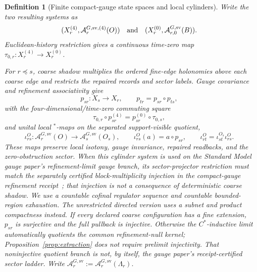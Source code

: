 \documentclass[11pt]{article}
\numberwithin{equation}{section}
\newtheorem{definition}[theorem]{Definition}
\theoremstyle{remark}
\begin{document}
\begin{definition}[Finite compact-gauge state spaces and local cylinders]
Write the two resulting systems as
\[
(X_r^{(4)},\mathcal A_r^{G,\mathrm{sv},(4)}(O))
\quad\hbox{and}\quad
(X_r^{(0)},\mathcal A_{r,0}^{G,\mathrm{sv}}(B)).
\]
Euclidean-history restriction gives a continuous time-zero map
\(\tau_{0,r}:X_r^{(4)}\to X_r^{(0)}\).

For \(r\preceq s\), coarse shadow multiplies the ordered fine-edge holonomies above each coarse
edge and restricts the repaired records and sector labels. Gauge covariance and refinement
associativity give
\[
p_{sr}:X_s\to X_r,
\qquad
p_{tr}=p_{sr}\circ p_{ts},
\]
with the four-dimensional/time-zero commuting square
\[
\tau_{0,r}\circ p_{sr}^{(4)}
=p_{sr}^{(0)}\circ\tau_{0,s},
\]
and unital local \(^*\)-maps on the separated support-visible quotient,
\[
\iota_{rs}^{O}:\mathcal A_r^{G,\mathrm{sv}}(O)\to
\mathcal A_s^{G,\mathrm{sv}}(O_s),
\qquad
\iota_{rs}^{O}(a)=a\circ p_{sr},
\qquad
\iota_{rt}^{O}=\iota_{st}^{O_s}\iota_{rs}^{O}.
\]
These maps preserve local isotony, gauge invariance, repaired readbacks, and the
zero-obstruction sector. When this cylinder system is used on the Standard Model gauge paper's refinement-limit
gauge branch, its sector-projector restriction must match the separately certified
block-multiplicity injection in the compact-gauge refinement receipt~\cite{oph2}; that injection is
not a consequence of deterministic coarse shadow. We use a countable cofinal regulator
sequence and countable bounded-region exhaustion. The unrestricted directed version uses a subnet
and product compactness instead. If every declared coarse configuration has a fine extension,
\(p_{sr}\) is surjective and the full pullback is injective. Otherwise the \(C^*\)-inductive limit
automatically quotients the common refinement-null kernel; Proposition~\ref{prop:extraction} does
not require prelimit injectivity. That noninjective quotient branch is not, by itself, the gauge
paper's receipt-certified sector ladder. Write
\(\mathcal A_r^{G,\mathrm{sv}}:=\mathcal A_r^{G,\mathrm{sv}}(\Lambda_r)\).
\end{definition}
\end{document}
